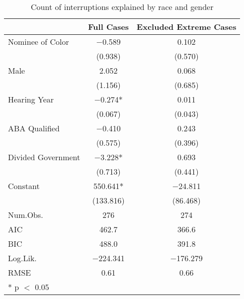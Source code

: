 
\begin{table}
\centering
\caption{Count of interruptions explained by race and gender}
\label{tab:neg_binomial}
\begin{tabular}[t]{lcc}
\toprule
  & Full Cases & Excluded Extreme Cases\\
\midrule
Nominee of Color & \num{-0.589} & \num{0.102}\\
 & (\num{0.938}) & (\num{0.570})\\
Male & \num{2.052} & \num{0.068}\\
 & (\num{1.156}) & (\num{0.685})\\
Hearing Year & \num{-0.274}* & \num{0.011}\\
 & (\num{0.067}) & (\num{0.043})\\
ABA Qualified & \num{-0.410} & \num{0.243}\\
 & (\num{0.575}) & (\num{0.396})\\
Divided Government & \num{-3.228}* & \num{0.693}\\
 & (\num{0.713}) & (\num{0.441})\\
Constant & \num{550.641}* & \num{-24.811}\\
 & (\num{133.816}) & (\num{86.468})\\
\midrule
Num.Obs. & \num{276} & \num{274}\\
AIC & \num{462.7} & \num{366.6}\\
BIC & \num{488.0} & \num{391.8}\\
Log.Lik. & \num{-224.341} & \num{-176.279}\\
RMSE & \num{0.61} & \num{0.66}\\
\bottomrule
\multicolumn{3}{l}{\rule{0pt}{1em}* p $<$ 0.05}\\
\end{tabular}
\end{table}
